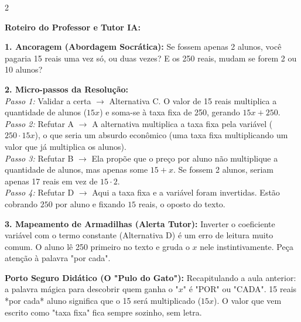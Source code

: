 \begin{multicols*}{2}
\ifgabarito
    \begin{tcolorbox}[colback=CorTitUm!5, colframe=CorTitUm, boxrule=1pt, arc=4pt, left=6pt, right=6pt, top=6pt, bottom=6pt]
    \small\textbf{\textcolor{CorTitUm}{Roteiro do Professor e Tutor IA:}}\par\vspace{0.1cm}
    \color{CinzaEscuro}
    \textbf{1. Ancoragem (Abordagem Socrática):} Se fossem apenas 2 alunos, você pagaria 15 reais uma vez só, ou duas vezes? E os 250 reais, mudam se forem 2 ou 10 alunos?\par\vspace{0.1cm}
    
    \textbf{2. Micro-passos da Resolução:}\\
    \textit{Passo 1:} Validar a certa $\rightarrow$ Alternativa C. O valor de 15 reais multiplica a quantidade de alunos ($15x$) e soma-se à taxa fixa de 250, gerando $15x + 250$.\\
    \textit{Passo 2:} Refutar A $\rightarrow$ A alternativa multiplica a taxa fixa pela variável ($250 \cdot 15x$), o que seria um absurdo econômico (uma taxa fixa multiplicando um valor que já multiplica os alunos).\\
    \textit{Passo 3:} Refutar B $\rightarrow$ Ela propõe que o preço por aluno não multiplique a quantidade de alunos, mas apenas some $15 + x$. Se fossem 2 alunos, seriam apenas 17 reais em vez de $15 \cdot 2$.\\
    \textit{Passo 4:} Refutar D $\rightarrow$ Aqui a taxa fixa e a variável foram invertidas. Estão cobrando $250$ por aluno e fixando $15$ reais, o oposto do texto.\par\vspace{0.1cm}
    
    \textbf{3. Mapeamento de Armadilhas (Alerta Tutor):} Inverter o coeficiente variável com o termo constante (Alternativa D) é um erro de leitura muito comum. O aluno lê 250 primeiro no texto e gruda o $x$ nele instintivamente. Peça atenção à palavra "por cada".
    \end{tcolorbox}
    \vspace{0.15cm}
    
    \begin{boxexplicacao}
    \textbf{Porto Seguro Didático (O "Pulo do Gato"):} Recapitulando a aula anterior: a palavra mágica para descobrir quem ganha o "$x$" é "POR" ou "CADA". 15 reais *por cada* aluno significa que o 15 será multiplicado ($15x$). O valor que vem escrito como "taxa fixa" fica sempre sozinho, sem letra.
    \end{boxexplicacao}
\fi


\end{multicols*}
